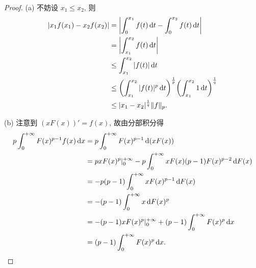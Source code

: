 \begin{proof}
    (a) 不妨设 $x_1\leq x_2$, 则
    \begin{align*}
        |x_1f(x_1)-x_2f(x_2)|
        & =\left|\int_0^{x_1}f(t)\mathop{}\!\mathrm{d} t-\int_0^{x_2}f(t)\mathop{}\!\mathrm{d} t\right| \\
        & =\left|\int_{x_1}^{x_2} f(t)\mathop{}\!\mathrm{d} t\right| \\
        & \leq \int_{x_1}^{x_2}|f(t)|\mathop{}\!\mathrm{d} t \\
        & \leq\biggl(\int_{x_1}^{x_2}|f(t)|^p\mathop{}\!\mathrm{d} t\biggr)^{\frac{1}{p}}\biggl(\int_{x_1}^{x_2} 1 \mathop{}\!\mathrm{d} t\biggr)^{\frac{1}{q}} \\
        & \leq |x_1-x_2|^{\frac{1}{q}}\|f\|_p.
    \end{align*}

    (b) 注意到 $(xF(x))'=f(x)$, 故由分部积分得
    \begin{align*}
        p\int_0^{+\infty} F(x)^{p-1}f(x)\mathop{}\!\mathrm{d} x
        & =p\int_0^{+\infty} F(x)^{p-1}\mathop{}\!\mathrm{d} (xF(x)) \\
        & =pxF(x)^p|_0^{+\infty}-p\int_0^{+\infty} xF(x)(p-1)F(x)^{p-2}\mathop{}\!\mathrm{d} F(x) \\
        & =-p(p-1)\int_0^{+\infty}xF(x)^{p-1}\mathop{}\!\mathrm{d} F(x) \\
        & =-(p-1)\int_0^{+\infty}x\mathop{}\!\mathrm{d} F(x)^p \\
        & =-(p-1)xF(x)^p|_0^{+\infty}+(p-1)\int_0^{+\infty} F(x)^p\mathop{}\!\mathrm{d} x \\
        & =(p-1)\int_0^{+\infty}F(x)^p\mathop{}\!\mathrm{d} x.
    \end{align*}
\end{proof}




